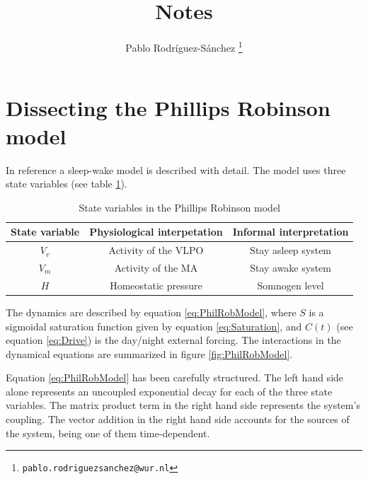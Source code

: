 \documentclass[a4paper, onecolumn, 10pt]{article}
\title{Notes}
\author[1]{Pablo Rodríguez-Sánchez \thanks{\texttt{pablo.rodriguezsanchez@wur.nl}}}
\affil[1]{Department of Aquatic Ecology, Wageningen University, The Netherlands}
\begin{document}
\maketitle

\clearpage

\section{Dissecting the Phillips Robinson model}
\label{sec:Dissecting}
In reference \cite{Phillips2007} a sleep-wake model is described with detail. The model uses three state variables (see table \ref{tab:StateVariables}).

\begin{table}[h]
	\begin{tabular}{|c|c|c|}
		\hline 
		State variable & Physiological interpetation & Informal interpretation \\ 
		\hline 
		$V_v$ & Activity of the VLPO & Stay asleep system \\ 
		\hline 
		$V_m$ & Activity of the MA & Stay awake system \\ 
		\hline 
		$H$ & Homeostatic pressure & Somnogen level \\ 
		\hline 
\end{tabular}
\caption{State variables in the Phillips Robinson model}
\label{tab:StateVariables}
\end{table}

The dynamics are described by equation \ref{eq:PhilRobModel}, where $S$ is a sigmoidal saturation function given by equation \ref{eq:Saturation}, and $C(t)$ (see equation \ref{eq:Drive}) is the day/night external forcing. The interactions in the dynamical equations are summarized in figure \ref{fig:PhilRobModel}.

Equation \ref{eq:PhilRobModel} has been carefully structured. The left hand side alone represents an uncoupled exponential decay for each of the three state variables. The matrix product term in the right hand side represents the system's coupling. The vector addition in the right hand side accounts for the sources of the system, being one of them time-dependent.
\end{document}
